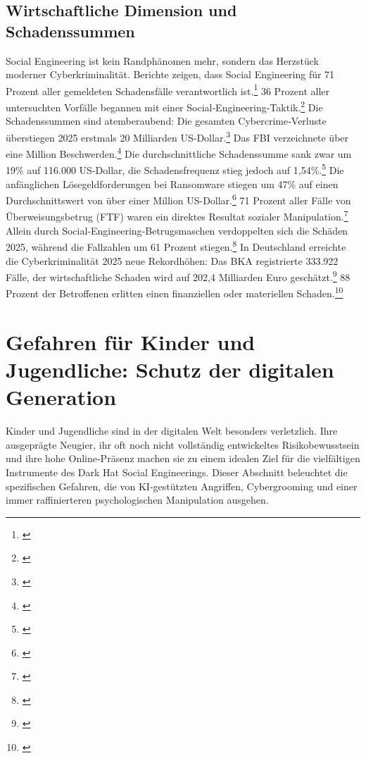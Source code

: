 \documentclass[10pt,a4paper]{article}
\begin{document}
	\subsection{Wirtschaftliche Dimension und Schadenssummen}
	Social Engineering ist kein Randphänomen mehr, sondern das Herzstück moderner Cyberkriminalität. Berichte zeigen, dass Social Engineering für 71 Prozent aller gemeldeten Schadensfälle verantwortlich ist.\footnote{\cite{CoalitionReport}} 36 Prozent aller untersuchten Vorfälle begannen mit einer Social‑Engineering‑Taktik.\footnote{\cite{ThreatSceneReport}} Die Schadenssummen sind atemberaubend: Die gesamten Cybercrime‑Verluste überstiegen 2025 erstmals 20 Milliarden US‑Dollar.\footnote{\cite{AxisStats}} Das FBI verzeichnete über eine Million Beschwerden.\footnote{\cite{FBIReport}} Die durchschnittliche Schadenssumme sank zwar um 19\% auf 116.000 US-Dollar, die Schadensfrequenz stieg jedoch auf 1,54\%.\footnote{\cite{CoalitionReport}} Die anfänglichen Lösegeldforderungen bei Ransomware stiegen um 47\% auf einen Durchschnittswert von über einer Million US-Dollar.\footnote{\cite{CoalitionReport}} 71 Prozent aller Fälle von Überweisungsbetrug (FTF) waren ein direktes Resultat sozialer Manipulation.\footnote{\cite{CoalitionReport}} Allein durch Social‑Engineering‑Betrugsmaschen verdoppelten sich die Schäden 2025, während die Fallzahlen um 61 Prozent stiegen.\footnote{\cite{AllianzTrade}} In Deutschland erreichte die Cyberkriminalität 2025 neue Rekordhöhen: Das BKA registrierte 333.922 Fälle, der wirtschaftliche Schaden wird auf 202,4 Milliarden Euro geschätzt.\footnote{\cite{BKAStats}} 88 Prozent der Betroffenen erlitten einen finanziellen oder materiellen Schaden.\footnote{\cite{BKAStats}}
	
	\section{Gefahren für Kinder und Jugendliche: Schutz der digitalen Generation}
	Kinder und Jugendliche sind in der digitalen Welt besonders verletzlich. Ihre ausgeprägte Neugier, ihr oft noch nicht vollständig entwickeltes Risikobewusstsein und ihre hohe Online‑Präsenz machen sie zu einem idealen Ziel für die vielfältigen Instrumente des Dark Hat Social Engineerings. Dieser Abschnitt beleuchtet die spezifischen Gefahren, die von KI‑gestützten Angriffen, Cybergrooming und einer immer raffinierteren psychologischen Manipulation ausgehen.
	
\end{document}
